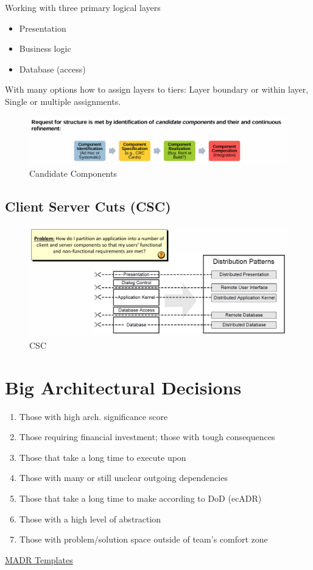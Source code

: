 \documentclass[../Main.tex]{subfiles}
\begin{document}
Working with three primary logical layers
\begin{itemize}
    \item Presentation
    \item Business logic
    \item Database (access)
\end{itemize}
With many options how to assign layers to tiers: Layer boundary or within layer,  Single or multiple assignments.
\begin{figure}[H]
    \centering
    \includegraphics[width=0.5\linewidth]{Images/candidatecomponents.png}
    \caption{Candidate Components}
    \label{fig:ccomponents}
\end{figure}
\newpage
\subsection{Client Server Cuts (CSC)}
\begin{figure}[H]
    \centering
    \includegraphics{Images/csc.png}
    \caption{CSC}
    \label{fig:csc}
\end{figure}

\section{Big Architectural Decisions}
\begin{enumerate}
    \item Those with high arch. significance score
    \item  Those requiring financial investment; those with tough consequences
    \item  Those that take a long time to execute upon
    \item Those with many or still unclear outgoing dependencies
    \item Those that take a long time to make according to DoD (ecADR)
    \item Those with a high level of abstraction 
    \item Those with problem/solution space outside of team's comfort zone 
\end{enumerate}
\href{https://github.com/adr/madr}{MADR Templates}
\newpage
\end{document}
